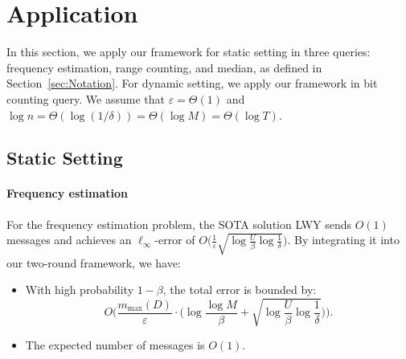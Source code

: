

\section{Application}
In this section, we apply our framework for static setting in three queries: frequency estimation, range counting, and median, as defined in Section~\ref{sec:Notation}.
For dynamic setting, we apply our framework in bit counting query. We assume that $\varepsilon = \Theta(1)$ and $\log n = \Theta(\log(1/\delta)) = \Theta(\log M)= \Theta(\log T)$.



\subsection{Static Setting}


\paragraph{Frequency estimation}


For the frequency estimation problem, the SOTA solution LWY \cite{luo2022frequency} sends $O(1)$ messages and achieves an $\ell_{\infty}$-error of
$O\big(\tfrac{1}{\varepsilon}\sqrt{\log \tfrac{U}{\beta} \log \tfrac{1}{\delta}}\big)$.
By integrating it into our two-round framework, we have:
\begin{itemize}
\item With high probability $1-\beta$, the total error is bounded by: 
$$
O\Big(\frac{m_{\max}(D)}{\varepsilon}\cdot \big(\log\frac{\log M}{\beta}+\sqrt{\log \frac{U}{\beta}\log\frac{1}{\delta}}\big)\Big).
$$
\item The expected number of messages is $O(1)$.
\end{itemize}

